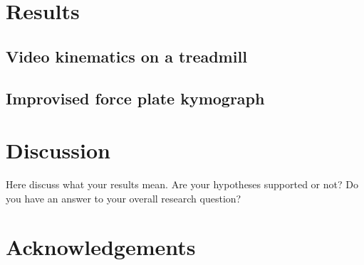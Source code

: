 \documentclass{article}
\begin{document}
\section{Results}
\subsection{Video kinematics on a treadmill}
\subsection{Improvised force plate kymograph}

\section{Discussion}
Here discuss what your results mean. Are your hypotheses supported or not? Do you have an answer to your overall research question?

\section{Acknowledgements}



\end{document}
